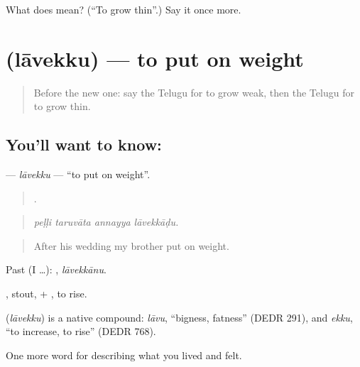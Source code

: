 \begin{tcolorbox}[breakable,colback=teal!4,colframe=teal!35!black,title={Before you move on}]
What does  mean? (\textquotedblleft{}To grow thin\textquotedblright{}.) Say it once more.
\end{tcolorbox}
\section[\texorpdfstring{\te{లావెక్కు} (lāvekku)}{లావెక్కు (lāvekku)}]{ (lāvekku) — to put on weight}

\label{lesson:TE-C521-lavekku}



\begin{quote}
Before the new one: say the Telugu for to grow weak, then the Telugu for to grow thin.
\end{quote}

\subsection*{You'll want to know: }
\textbf{} — \emph{lāvekku} — \textquotedblleft{}to put on weight\textquotedblright{}.

\begin{quote}
   .
\end{quote}

\begin{quote}
\emph{peḷḷi taruvāta annayya lāvekkāḍu.}
\end{quote}

\begin{quote}
After his wedding my brother put on weight.
\end{quote}

Past (I …): , \emph{lāvekkānu}.

, stout, + , to rise.

\begin{cousinweb}
\textbf{} (\emph{lāvekku}) is a native compound: \emph{lāvu}, \textquotedblleft{}bigness, fatness\textquotedblright{} (DEDR 291), and \emph{ekku}, \textquotedblleft{}to increase, to rise\textquotedblright{} (DEDR 768).
\end{cousinweb}

\begin{grammarlens}[title={What you've built}]
One more word for describing what you lived and felt.
\end{grammarlens}

